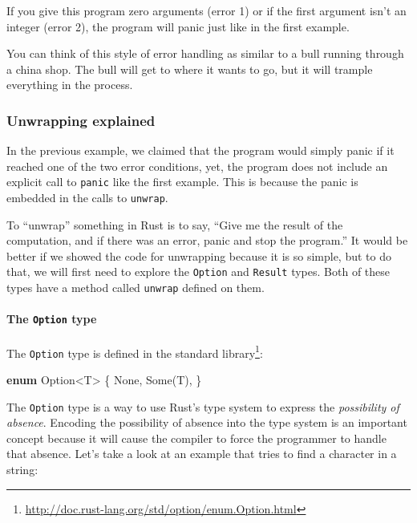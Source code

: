 \documentclass[a4paper,]{book}
\newenvironment{Shaded}{\begin{snugshade}}{\end{snugshade}}
\newcommand{\KeywordTok}[1]{\textcolor[rgb]{0.13,0.29,0.53}{\textbf{{#1}}}}
\newcommand{\DataTypeTok}[1]{\textcolor[rgb]{0.13,0.29,0.53}{{#1}}}
\newcommand{\ConstantTok}[1]{\textcolor[rgb]{0.00,0.00,0.00}{{#1}}}
\newcommand{\NormalTok}[1]{{#1}}
\renewcommand{\href}[2]{#2\footnote{\url{#1}}}
\let\oldparagraph\paragraph
\renewcommand{\paragraph}[1]{\oldparagraph{#1}\mbox{}}
\begin{document}
If you give this program zero arguments (error 1) or if the first
argument isn't an integer (error 2), the program will panic just like in
the first example.

You can think of this style of error handling as similar to a bull
running through a china shop. The bull will get to where it wants to go,
but it will trample everything in the process.

\hypertarget{unwrapping-explained}{\subsubsection{Unwrapping
explained}\label{unwrapping-explained}}

In the previous example, we claimed that the program would simply panic
if it reached one of the two error conditions, yet, the program does not
include an explicit call to \texttt{panic} like the first example. This
is because the panic is embedded in the calls to \texttt{unwrap}.

To ``unwrap'' something in Rust is to say, ``Give me the result of the
computation, and if there was an error, panic and stop the program.'' It
would be better if we showed the code for unwrapping because it is so
simple, but to do that, we will first need to explore the
\texttt{Option} and \texttt{Result} types. Both of these types have a
method called \texttt{unwrap} defined on them.

\hypertarget{the-option-type}{\paragraph{\texorpdfstring{The
\texttt{Option} type}{The Option type}}\label{the-option-type}}

The \texttt{Option} type is
\href{http://doc.rust-lang.org/std/option/enum.Option.html}{defined in
the standard library}:

\begin{Shaded}
\begin{Highlighting}[]
\KeywordTok{enum} \DataTypeTok{Option}\NormalTok{<T> \{}
    \ConstantTok{None}\NormalTok{,}
    \ConstantTok{Some}\NormalTok{(T),}
\NormalTok{\}}
\end{Highlighting}
\end{Shaded}

The \texttt{Option} type is a way to use Rust's type system to express
the \emph{possibility of absence}. Encoding the possibility of absence
into the type system is an important concept because it will cause the
compiler to force the programmer to handle that absence. Let's take a
look at an example that tries to find a character in a string:
\end{document}
